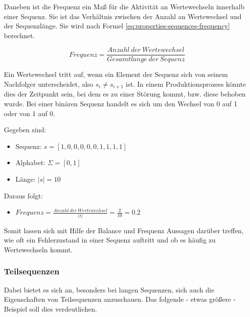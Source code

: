 Daneben ist die Frequenz ein Maß für die Aktivität an Wertewechseln innerhalb einer Sequenz. Sie ist das Verhältnis zwischen der Anzahl an Wertewechsel und der Sequenzlänge. Sie wird nach Formel \ref{eq:properties-sequences-frequency} berechnet. 

\begin{equation}
\label{eq:properties-sequences-frequency}
Frequenz = \frac{Anzahl\ der\ Wertewechsel}{Gesamtl\ddot{a}nge\ der\ Sequenz}
\end{equation}

Ein Wertewechsel tritt auf, wenn ein Element der Sequenz sich von seinem Nachfolger unterscheidet, also $s_{i} \neq s_{i+1}$ ist. In einem Produktionsprozess könnte dies der Zeitpunkt sein, bei dem es zu einer Störung kommt, bzw. diese behoben wurde. Bei einer binären Sequenz handelt es sich um den Wechsel von 0 auf 1 oder von 1 auf 0.

\begin{theorem}
Gegeben sind:
\begin{itemize}[noitemsep]
	\item Sequenz: $s = [1,0,0,0,0,0,1,1,1,1]$
	\item Alphabet: $\Sigma = [0,1]$
	\item Länge: $|s| = 10$
\end{itemize}
Daraus folgt:
\begin{itemize}[noitemsep]
	\item [] $Frequenz = \frac{Anzahl\ der\ Wertewechsel}{|s|} = \frac{2}{10} = 0.2$
\end{itemize}
\end{theorem}

Somit lassen sich mit Hilfe der Balance und Frequenz Aussagen darüber treffen, wie oft ein Fehlerzustand in einer Sequenz auftritt und ob es häufig zu Wertewechseln kommt. 

\subsubsection{Teilsequenzen}

Dabei bietet es sich an, besonders bei langen Sequenzen, sich auch die Eigenschaften von Teilsequenzen anzuschauen. Das folgende - etwas größere - Beispiel soll dies verdeutlichen.

